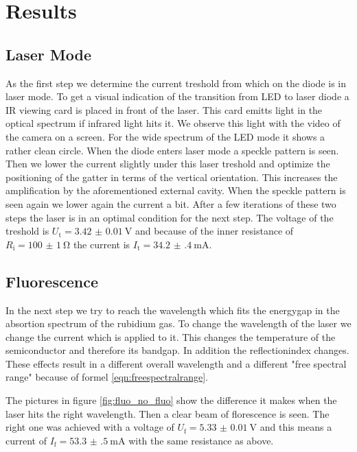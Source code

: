 \section{Results}
\label{sec:Auswertung}

\subsection{Laser Mode}

As the first step we determine the current treshold from which on the diode is in laser mode. To get a visual indication of the transition from LED to laser diode a IR viewing card is placed in front of the laser. This card emitts light in the optical spectrum if infrared light hits it. We observe this light with the video of the camera on a screen. For the wide spectrum of the LED mode it shows a rather clean circle. When the diode enters laser mode a speckle pattern is seen. Then we lower the current slightly under this laser treshold and optimize the positioning of the gatter in terms of the vertical orientation. This increases the amplification by the aforementioned external cavity. When the speckle pattern is seen again we lower again the current a bit. After a few iterations of these two steps the laser is in an optimal condition for the next step. The voltage of the treshold is $U_\text{t} = \SI{3.42(1)}{\volt}$ and because of the inner resistance of $R_\text{i} = \SI{100(1)}{\ohm}$ the current is $I_\text{t} = \SI{34.2(4)}{\milli\ampere}$.

\subsection{Fluorescence}

In the next step we try to reach the wavelength which fits the energygap in the absortion spectrum of the rubidium gas. To change the wavelength of the laser we change the current which is applied to it. This changes the temperature of the semiconductor and therefore its bandgap. In addition the reflectionindex changes. These effects result in a different overall wavelength and a different "free spectral range" because of formel \eqref{eqn:freespectralrange}.

The pictures in figure \ref{fig:fluo_no_fluo} show the difference it makes when the laser hits the right wavelength. Then a clear beam of florescence is seen. The right one was achieved with a voltage of $U_\text{f} = \SI{5.33(1)}{\volt}$ and this means a current of $I_\text{f} = \SI{53.3(5)}{\milli\ampere}$ with the same resistance as above.

